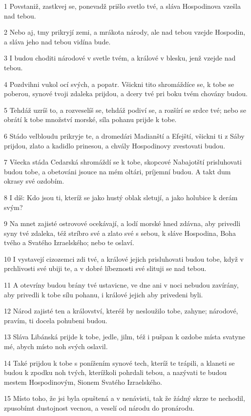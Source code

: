 \par 1 Povstaniž, zastkvej se, ponevadž prišlo svetlo tvé, a sláva Hospodinova vzešla nad tebou.
\par 2 Nebo aj, tmy prikryjí zemi, a mrákota národy, ale nad tebou vzejde Hospodin, a sláva jeho nad tebou vidína bude.
\par 3 I budou choditi národové v svetle tvém, a králové v blesku, jenž vzejde nad tebou.
\par 4 Pozdvihni vukol ocí svých, a popatr. Všickni tito shromáždíce se, k tobe se poberou, synové tvoji zdaleka prijdou, a dcery tvé pri boku tvém chovány budou.
\par 5 Tehdáž uzríš to, a rozveselíš se, tehdáž podiví se, a rozšírí se srdce tvé; nebo se obrátí k tobe množství morské, síla pohanu prijde k tobe.
\par 6 Stádo velbloudu prikryje te, a dromedári Madianští a Efejští, všickni ti z Sáby prijdou, zlato a kadidlo prinesou, a chvály Hospodinovy zvestovati budou.
\par 7 Všecka stáda Cedarská shromáždí se k tobe, skopcové Nabajotští prisluhovati budou tobe, a obetováni jsouce na mém oltári, príjemní budou. A takt dum okrasy své ozdobím.
\par 8 I díš: Kdo jsou ti, kteríž se jako hustý oblak sletují, a jako holubice k derám svým?
\par 9 Na mnet zajisté ostrovové ocekávají, a lodí morské hned zdávna, aby privedli syny tvé zdaleka, též stríbro své a zlato své s sebou, k sláve Hospodina, Boha tvého a Svatého Izraelského; nebo te oslaví.
\par 10 I vystavejí cizozemci zdi tvé, a králové jejich prisluhovati budou tobe, když v prchlivosti své ubiji te, a v dobré líbeznosti své slituji se nad tebou.
\par 11 A otevríny budou brány tvé ustavicne, ve dne ani v noci nebudou zavírány, aby privedli k tobe sílu pohanu, i králové jejich aby privedeni byli.
\par 12 Národ zajisté ten a království, kteréž by nesloužilo tobe, zahyne; národové, pravím, ti docela pohubeni budou.
\par 13 Sláva Libánská prijde k tobe, jedle, jilm, též i pušpan k ozdobe místa svatyne mé, abych místo noh svých oslavil.
\par 14 Také prijdou k tobe s ponížením synové tech, kteríž te trápili, a klaneti se budou k zpodku noh tvých, kterížkoli pohrdali tebou, a nazývati te budou mestem Hospodinovým, Sionem Svatého Izraelského.
\par 15 Místo toho, že jsi byla opuštená a v nenávisti, tak že žádný skrze te nechodil, zpusobímt dustojnost vecnou, a veselí od národu do pronárodu.
